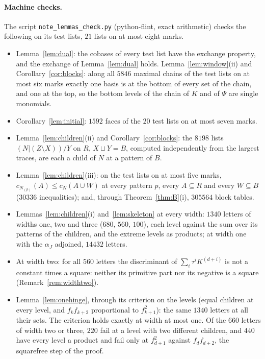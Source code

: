 \documentclass[11pt]{article}
\theoremstyle{plain}
\theoremstyle{definition}
\theoremstyle{remark}
\begin{document}
\paragraph{Machine checks.} The script \texttt{note\_lemmas\_check.py} (python-flint, exact arithmetic) checks the following on its test lists, $21$ lists on at most eight marks.
\begin{itemize}
\item Lemma~\ref{lem:dual}: the cobases of every test list have the exchange property, and the exchange of Lemma~\ref{lem:dual} holds. Lemma~\ref{lem:window}(ii) and Corollary~\ref{cor:blocks}: along all $5846$ maximal chains of the test lists on at most six marks exactly one basis is at the bottom of every set of the chain, and one at the top, so the bottom levels of the chain of $K$ and of $\Psi$ are single monomials.
\item Corollary~\ref{lem:initial}: $1592$ faces of the $20$ test lists on at most seven marks.
\item Lemma~\ref{lem:children}(ii) and Corollary~\ref{cor:blocks}: the $8198$ lists $(N|(Z\setminus X))/Y$ on $R$, $X\sqcup Y=B$, computed independently from the largest traces, are each a child of $N$ at a pattern of $B$.
\item Lemma~\ref{lem:children}(iii): on the test lists on at most five marks, $c_{N_{(p)}}(A)\le c_N(A\cup W)$ at every pattern $p$, every $A\subseteq R$ and every $W\subseteq B$ ($30336$ inequalities); and, through Theorem~\ref{thm:B}(i), $305564$ block tables.
\item Lemmas~\ref{lem:children}(i) and~\ref{lem:skeleton} at every width: $1340$ letters of widths one, two and three ($680$, $560$, $100$), each level against the sum over its patterns of the children, and the extreme levels as products; at width one with the $\alpha_J$ adjoined, $14432$ letters.
\item At width two: for all $560$ letters the discriminant of $\sum_i\tau^iK^{(d+i)}$ is not a constant times a square: neither its primitive part nor its negative is a square (Remark~\ref{rem:widthtwo}).
\item Lemma~\ref{lem:onehinge}, through its criterion on the levels (equal children at every level, and $f_kf_{k+2}$ proportional to $f_{k+1}^2$): the same $1340$ letters at all their sets. The criterion holds exactly at width at most one. Of the $660$ letters of width two or three, $220$ fail at a level with two different children, and $440$ have every level a product and fail only at $f_{d+1}^2$ against $f_df_{d+2}$, the squarefree step of the proof.

\end{itemize}
\end{document}
